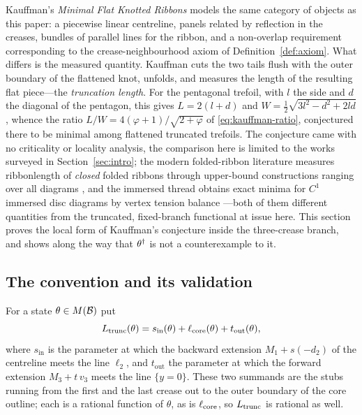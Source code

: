 Kauffman's \emph{Minimal Flat Knotted Ribbons} \cite{kauffman2004} models the same category of objects as this paper: a piecewise linear centreline, panels related by reflection in the creases, bundles of parallel lines for the ribbon, and a non-overlap requirement corresponding to the crease-neighbourhood axiom of Definition~\ref{def:axiom}. What differs is the measured quantity. Kauffman cuts the two tails flush with the outer boundary of the flattened knot, unfolds, and measures the length of the resulting flat piece---the \emph{truncation length}. For the pentagonal trefoil, with $l$ the side and $d$ the diagonal of the pentagon, this gives $L=2(l+d)$ and $W=\frac12\sqrt{3l^2-d^2+2ld}$, whence the ratio $L/W=4(\varphi+1)/\sqrt{2+\varphi}$ of \eqref{eq:kauffman-ratio}, conjectured there to be minimal among flattened truncated trefoils. The conjecture came with no criticality or locality analysis, the comparison here is limited to the works surveyed in Section~\ref{sec:intro}; the modern folded-ribbon literature measures ribbonlength of \emph{closed} folded ribbons through upper-bound constructions ranging over all diagrams \cite{denne2020,chen2025}, and the immersed thread obtains exact minima for $C^1$ immersed disc diagrams by vertex tension balance \cite{immersed2020,ayala2025}---both of them different quantities from the truncated, fixed-branch functional at issue here. This section proves the local form of Kauffman's conjecture inside the three-crease branch, and shows along the way that $\theta^\dagger$ is not a counterexample to it.

\subsection{The convention and its validation}

\begin{definition}\label{def:trunc}
For a state $\theta\in M(\mathcal{B})$ put
\begin{equation}\label{eq:Ltrunc}
  L_{\mathrm{trunc}}(\theta)=s_{\mathrm{in}}(\theta)+\ell_{\mathrm{core}}(\theta)+t_{\mathrm{out}}(\theta),
\end{equation}
where $s_{\mathrm{in}}$ is the parameter at which the backward extension $M_1+s(-d_2)$ of the centreline meets the line $\ell_2$, and $t_{\mathrm{out}}$ the parameter at which the forward extension $M_3+t\,v_3$ meets the line $\{y=0\}$. These two summands are the stubs running from the first and the last crease out to the outer boundary of the core outline; each is a rational function of $\theta$, as is $\ell_{\mathrm{core}}$, so $L_{\mathrm{trunc}}$ is rational as well.
\end{definition}

